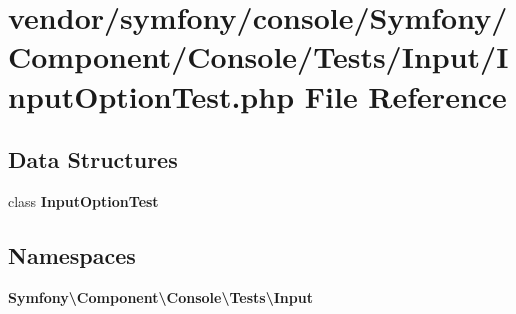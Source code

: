 \section{vendor/symfony/console/\+Symfony/\+Component/\+Console/\+Tests/\+Input/\+Input\+Option\+Test.php File Reference}
\label{_input_option_test_8php}
\subsection*{Data Structures}
\begin{DoxyCompactItemize}
\item 
class {\bf Input\+Option\+Test}
\end{DoxyCompactItemize}
\subsection*{Namespaces}
\begin{DoxyCompactItemize}
\item 
 {\bf Symfony\textbackslash{}\+Component\textbackslash{}\+Console\textbackslash{}\+Tests\textbackslash{}\+Input}
\end{DoxyCompactItemize}
